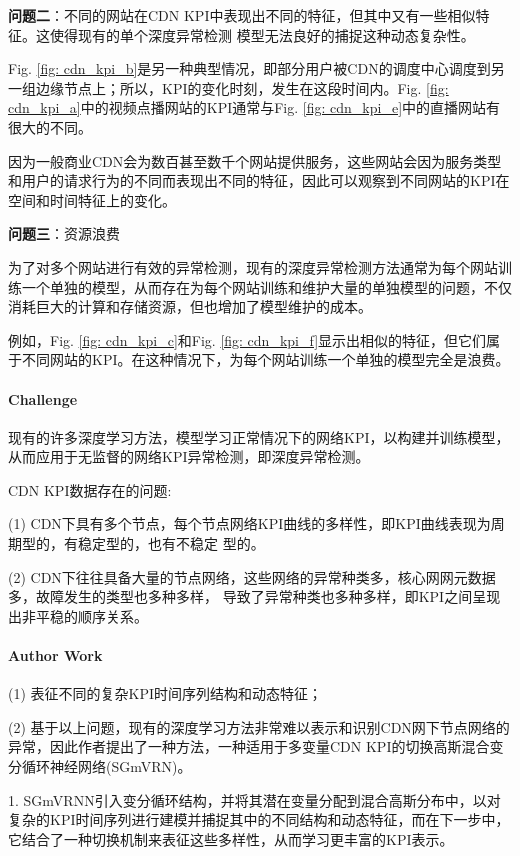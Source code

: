 \documentclass[letterpaper,12pt]{article}
\begin{document}
	\textbf{问题二}：不同的网站在CDN KPI中表现出不同的特征，但其中又有一些相似特征。这使得现有的单个深度异常检测
	模型无法良好的捕捉这种动态复杂性。
	
	Fig. \ref{fig: cdn_kpi_b}是另一种典型情况，即部分用户被CDN的调度中心调度到另一组边缘节点上；所以，KPI的变化时刻，发生在这段时间内。Fig. \ref{fig: cdn_kpi_a}中的视频点播网站的KPI通常与Fig. \ref{fig: cdn_kpi_e}中的直播网站有很大的不同。
	
	因为一般商业CDN会为数百甚至数千个网站提供服务，这些网站会因为服务类型和用户的请求行为的不同而表现出不同的特征，因此可以观察到不同网站的KPI在空间和时间特征上的变化。
	
	\textbf{问题三}：资源浪费
	
	为了对多个网站进行有效的异常检测，现有的深度异常检测方法通常为每个网站训练一个单独的模型，从而存在为每个网站训练和维护大量的单独模型的问题，不仅消耗巨大的计算和存储资源，但也增加了模型维护的成本。
	
	例如，Fig. \ref{fig: cdn_kpi_c}和Fig. \ref{fig: cdn_kpi_f}显示出相似的特征，但它们属于不同网站的KPI。在这种情况下，为每个网站训练一个单独的模型完全是浪费。
	
	\paragraph{Challenge}
	
	现有的许多深度学习方法，模型学习正常情况下的网络KPI，以构建并训练模型，从而应用于无监督的网络KPI异常检测，即深度异常检测。
	
	CDN KPI数据存在的问题:
	
	(1) CDN下具有多个节点，每个节点网络KPI曲线的多样性，即KPI曲线表现为周期型的，有稳定型的，也有不稳定
	型的。
	
	(2) CDN下往往具备大量的节点网络，这些网络的异常种类多，核心网网元数据多，故障发生的类型也多种多样，
	导致了异常种类也多种多样，即KPI之间呈现出非平稳的顺序关系。
	
	\paragraph{Author Work}
	
	(1) 表征不同的复杂KPI时间序列结构和动态特征；
	
	(2) 基于以上问题，现有的深度学习方法非常难以表示和识别CDN网下节点网络的异常，因此作者提出了一种方法，一种适用于多变量CDN KPI的切换高斯混合变分循环神经网络(SGmVRN)。
		
		1. SGmVRNN引入变分循环结构，并将其潜在变量分配到混合高斯分布中，以对复杂的KPI时间序列进行建模并捕捉其中的不同结构和动态特征，而在下一步中，它结合了一种切换机制来表征这些多样性，从而学习更丰富的KPI表示。
		
\end{document}
